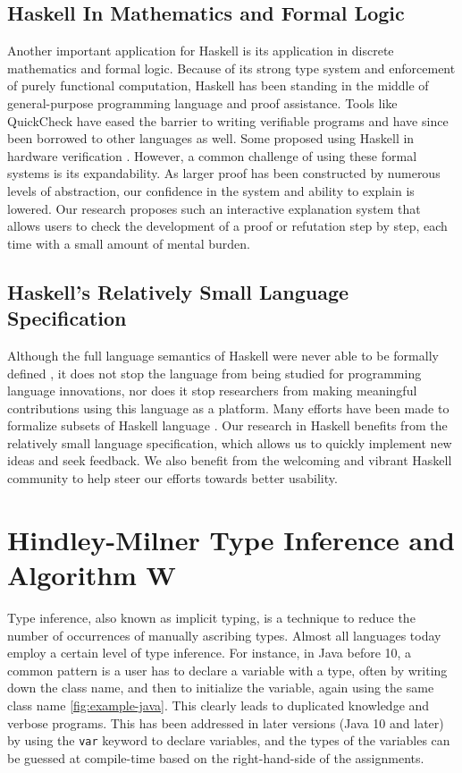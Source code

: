 \subsection{Haskell In Mathematics and Formal Logic}

Another important application for Haskell is its application in discrete mathematics and formal logic. Because of its strong type system and enforcement of purely functional computation, Haskell has been standing in the middle of general-purpose programming language and proof assistance. Tools like QuickCheck \cite{Claessen2000-rl} have eased the barrier to writing verifiable programs and have since been borrowed to other languages as well. Some proposed using Haskell in hardware verification \cite{Bjesse1998-lh}. However, a common challenge of using these formal systems is its expandability. As larger proof has been constructed by numerous levels of abstraction, our confidence in the system and ability to explain is lowered. Our research proposes such an interactive explanation system that allows users to check the development of a proof or refutation step by step, each time with a small amount of mental burden. 


\subsection{Haskell's Relatively Small Language Specification}

Although the full language semantics of Haskell were never able to be formally defined \cite{Hudak2007-kn}, it does not stop the language from being studied for programming language innovations, nor does it stop researchers from making meaningful contributions using this language as a platform. Many efforts have been made to formalize subsets of Haskell language \cite{FaxEn2002-nd}. Our research in Haskell benefits from the relatively small language specification, which allows us to quickly implement new ideas and seek feedback.  We also benefit from the welcoming and vibrant Haskell community to help steer our efforts towards better usability. 




\section{Hindley-Milner Type Inference and Algorithm W}

Type inference, also known as implicit typing, is a technique to reduce the number of occurrences of manually ascribing types. Almost all languages today employ a certain level of type inference. For instance, in Java before 10, a common pattern is a user has to declare a variable with a type, often by writing down the class name, and then to initialize the variable, again using the same class name \ref{fig:example-java}. This clearly leads to duplicated knowledge and verbose programs. This has been addressed in later versions (Java 10 and later) by using the \texttt{var} keyword \cite{noauthor_undated-an} to declare variables, and the types of the variables can be guessed at compile-time based on the right-hand-side of the assignments.  

